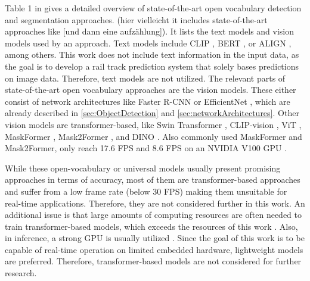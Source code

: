 Table 1 in \cite{openvocabularysurvey2024} gives a detailed overview of state-of-the-art open vocabulary detection and segmentation approaches.
(hier vielleicht it includes state-of-the-art approaches like [und dann eine aufzählung]).
It lists the text models and vision models used by an approach.
Text models include CLIP \cite{CLIP2021}, BERT \cite{BERT2019}, or ALIGN \cite{ALIGN2021}, among others.
This work does not include text information in the input data, as the goal is to develop a rail track prediction system that solely bases predictions on image data.
Therefore, text models are not utilized.
The relevant parts of state-of-the-art open vocabulary approaches are the vision models.
These either consist of network architectures like Faster R-CNN or EfficientNet \cite{openvocabularysurvey2024}, which are already described in \autoref{sec:ObjectDetection} and \autoref{sec:networkArchitectures}.
Other vision models are transformer-based, like Swin Transformer \cite{swinTransformer2021}, CLIP-vision \cite{CLIP2021}, ViT \cite{ViT2021}, MaskFormer \cite{MaskFormer2021}, Mask2Former \cite{mask2Former2022}, and DINO \cite{DINO2022}.
Also commonly used MaskFormer and Mask2Former, only reach 17.6 FPS and 8.6 FPS on an NVIDIA V100 GPU \cite{mask2Former2022}.

While these open-vocabulary or universal models usually present promising approaches in terms of accuracy, most of them are transformer-based approaches and suffer from a low frame rate (below 30 FPS) \cite{carion2020endtoendobjectdetectiontransformers, groundingdino2024, swinTransformer2021, MaskFormer2021, mask2Former2022, glipv22022} making them unsuitable for real-time applications.
Therefore, they are not considered further in this work.
An additional issue is that large amounts of computing resources are often needed to train transformer-based models, which exceeds the resources of this work \cite{groundingdino2024} \cite{glipv22022}.
Also, in inference, a strong GPU is usually utilized \cite{groundingdino2024} \cite{glipv22022}.
Since the goal of this work is to be capable of real-time operation on limited embedded hardware, lightweight models are preferred.
Therefore, transformer-based models are not considered for further research.